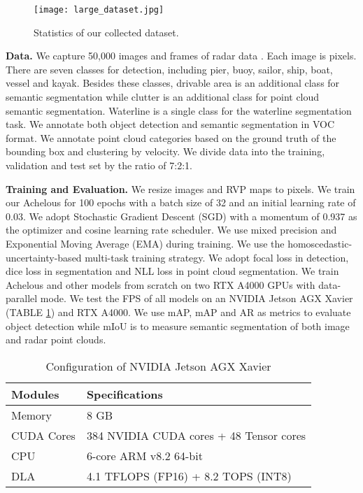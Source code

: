 \documentclass[letterpaper, 10 pt, conference]{ieeeconf}
\begin{document}
 \begin{figure}
    \centering
    \texttt{[image: large\_dataset.jpg]}
    \caption{Statistics of our collected dataset.}
    \label{fig:dataset_statistics}
\end{figure}

 \textbf{Data.} We capture 50,000 images and frames of radar data \cite{yao2023waterscenes}. Each image is  pixels. There are seven classes for detection, including pier, buoy, sailor, ship, boat, vessel and kayak. Besides these classes, drivable area is an additional class for semantic segmentation while clutter is an additional class for point cloud semantic segmentation. Waterline is a single class for the waterline segmentation task. We annotate both object detection and semantic segmentation in VOC format. We annotate point cloud categories based on the ground truth of the bounding box and clustering by velocity. We divide data into the training, validation and test set by the ratio of 7:2:1.

\textbf{Training and Evaluation.} We resize images and RVP maps to  pixels. We train our Achelous for 100 epochs with a batch size of 32 and an initial learning rate of 0.03. We adopt Stochastic Gradient Descent (SGD) with a momentum of 0.937 as the optimizer and cosine learning rate scheduler. We use mixed precision and Exponential Moving Average (EMA) during training. We use the homoscedastic-uncertainty-based \cite{kendall2018multi} multi-task training strategy. We adopt focal loss in detection, dice loss in segmentation and NLL loss in point cloud segmentation. We train Achelous and other models from scratch on two RTX A4000 GPUs with data-parallel mode. We test the FPS of all models on an NVIDIA Jetson AGX Xavier (TABLE \ref{tab:jetson}) and RTX A4000. We use mAP, mAP and AR as metrics to evaluate object detection while mIoU is to measure semantic segmentation of both image and radar point clouds.

\begin{table}
\setlength\tabcolsep{3.5pt}
\caption{Configuration of NVIDIA Jetson AGX Xavier}
\centering
\label{tab:jetson}
\begin{tabular}{l|l}  
\toprule   
  Modules & Specifications \\
\midrule 
  Memory & 8 GB \\
  CUDA Cores & 384 NVIDIA CUDA cores + 48 Tensor cores \\
  CPU & 6-core ARM v8.2 64-bit \\
  DLA & 4.1 TFLOPS (FP16) + 8.2 TOPS (INT8)\\


\bottomrule  
\end{tabular}
\end{table}
\end{document}
